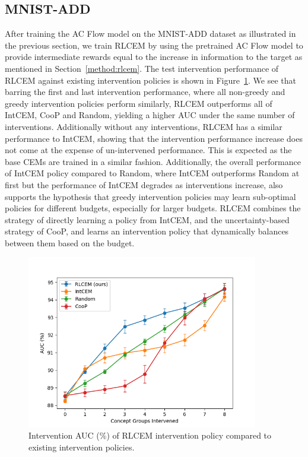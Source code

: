 \subsection{MNIST-ADD}

After training the AC Flow model on the MNIST-ADD dataset 
as illustrated in the previous section, we train RLCEM by 
using the
pretrained AC Flow model to provide intermediate rewards equal to 
the increase in information to the target as mentioned in 
Section~\ref{method:rlcem}.
The test intervention performance of RLCEM against 
existing intervention policies is shown in
Figure~\ref{fig:mnist-performance-no-l2}.
We see that barring the first and last intervention performance,
where all non-greedy and greedy intervention policies perform similarly,
RLCEM outperforms all of IntCEM, CooP and Random, yielding a 
higher AUC under the same number of interventions.
Additionally without any interventions, RLCEM has a similar performance to 
IntCEM, showing that the intervention performance
increase does not come at the expense of un-intervened performance.
This is expected as the base CEMs are trained 
in a similar fashion. Additionally, the overall performance of IntCEM policy
compared to Random, where IntCEM outperforms Random at first but the performance of 
IntCEM degrades as interventions increase,
also supports the hypothesis that greedy intervention policies may learn
sub-optimal policies for different budgets, especially for larger budgets.
RLCEM combines the strategy of directly learning a policy from IntCEM,
and the uncertainty-based strategy of CooP, and learns an intervention policy
that dynamically balances between them based on the budget.

\begin{figure}[!ht]
    \centering
    \includegraphics[width=0.9\textwidth]{figs/evaluation/mnist_rlcem_performance.png}
    \caption{
        Intervention AUC (\%) of RLCEM intervention
    policy compared to existing intervention policies.
    }
    \label{fig:mnist-performance-no-l2}
\end{figure}

